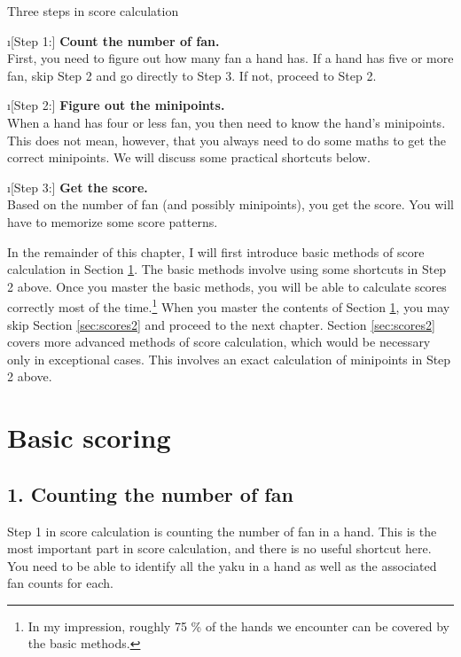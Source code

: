 \begin{itembox}[c]{Three steps in score calculation}
\begin{description}
\i[Step 1:] {\bf Count the number of {\jap fan}.}\\ 
First, you need to figure out how many {\jap fan} a hand has. If a hand has five or more {\jap fan}, skip Step 2 and go directly to Step 3. If not, proceed to Step 2. 

\i[Step 2:] {\bf Figure out the minipoints.}\\ 
When a hand has four or less {\jap fan}, you then need to know the hand's minipoints. This does not mean, however, that you always need to do some maths to get the correct minipoints. We will discuss some practical shortcuts below.

\i[Step 3:] {\bf Get the score.}\\
Based on the number of {\jap fan} (and possibly minipoints), you get the score. You will have to memorize some score patterns.
\end{description}
\end{itembox}

\bigskip
In the remainder of this chapter, I will first introduce basic methods of score calculation in Section \ref{sec:scores1}. The basic methods involve using some shortcuts in Step 2 above. Once you master the basic methods, you will be able to calculate scores correctly most of the time.\footnote{In my impression, roughly 75 \% of the hands we encounter can be covered by the basic methods.} When you master the contents of Section \ref{sec:scores1}, you may skip Section \ref{sec:scores2} and proceed to the next chapter. Section \ref{sec:scores2} covers more advanced methods of score calculation, which would be necessary only in exceptional cases. This involves an exact calculation of minipoints in Step 2 above. 


\section{Basic scoring}\label{sec:scores1}

\subsection*{1. Counting the number of {\jap fan}}
Step 1 in score calculation is counting the number of {\jap fan} in a hand. This is the most important part in score calculation, and there is no useful shortcut here. You need to be able to identify all the {\jap yaku} in a hand as well as the associated {\jap fan} counts for each. 

